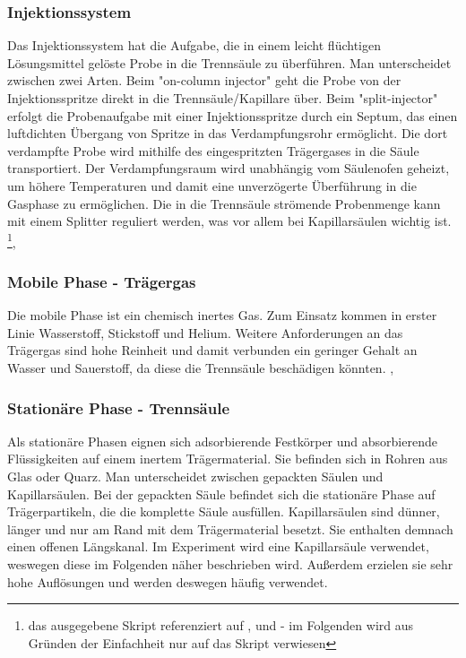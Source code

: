     \subsubsection{Injektionssystem}
      
      Das Injektionssystem hat die Aufgabe, die in einem leicht flüchtigen Lösungsmittel gelöste Probe in die Trennsäule zu überführen. Man unterscheidet zwischen zwei Arten. Beim "on-column injector" geht die Probe von der Injektionsspritze direkt in die Trennsäule/Kapillare über. Beim "split-injector" erfolgt die Probenaufgabe mit einer Injektionsspritze durch ein Septum, das einen luftdichten Übergang von Spritze in das Verdampfungsrohr ermöglicht. Die dort verdampfte Probe wird mithilfe des eingespritzten Trägergases in die Säule transportiert. Der Verdampfungsraum wird unabhängig vom Säulenofen geheizt, um höhere Temperaturen und damit eine unverzögerte Überführung in die Gasphase zu ermöglichen. Die in die Trennsäule strömende Probenmenge kann mit einem Splitter reguliert werden, was vor allem bei Kapillarsäulen wichtig ist. \citep{Versuchsvorschrift}\footnote{das ausgegebene Skript referenziert auf \citep{QuantitativeAnalyseHarris}, \citep{InstrumentelleAnalytikSkoog} und \citep{ModernLiquidChromatography} - im Folgenden wird aus Gründen der Einfachheit nur auf das Skript verwiesen}, \citep[S. 164]{Taschenatlas}          
      
    \subsubsection{Mobile Phase - Trägergas}
      
      Die mobile Phase ist ein chemisch inertes Gas. Zum Einsatz kommen in erster Linie Wasserstoff, Stickstoff und Helium. Weitere Anforderungen an das Trägergas sind hohe Reinheit und damit verbunden ein geringer Gehalt an Wasser und Sauerstoff, da diese die Trennsäule beschädigen könnten. \citep{Versuchsvorschrift}, \citep{Taschenatlas}
      
    \subsubsection{Stationäre Phase - Trennsäule}
      
      Als stationäre Phasen eignen sich adsorbierende Festkörper und absorbierende Flüssigkeiten auf einem inertem Trägermaterial. Sie befinden sich in Rohren aus Glas oder Quarz. Man unterscheidet zwischen gepackten Säulen und Kapillarsäulen. Bei der gepackten Säule befindet sich die stationäre Phase auf Trägerpartikeln, die die komplette Säule ausfüllen. Kapillarsäulen sind dünner, länger und nur am Rand mit dem Trägermaterial besetzt. Sie enthalten demnach einen offenen Längskanal. Im Experiment wird eine Kapillarsäule verwendet, weswegen diese im Folgenden näher beschrieben wird. Außerdem erzielen sie sehr hohe Auflösungen und werden deswegen häufig verwendet.
      
